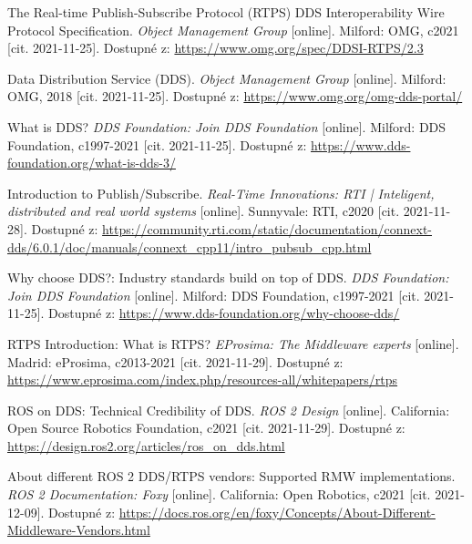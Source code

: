 \begin{thebibliography}{99}
The Real-time Publish-Subscribe Protocol (RTPS) DDS Interoperability Wire Protocol Specification. \textit{Object Management Group} [online]. Milford: OMG, c2021 [cit. 2021-11-25]. Dostupné z: \href{https://www.omg.org/spec/DDSI-RTPS/2.3}{https://www.omg.org/spec/DDSI-RTPS/2.3}
	
Data Distribution Service (DDS). \textit{Object Management Group} [online]. Milford: OMG, 2018 [cit. 2021-11-25]. Dostupné z: \href{https://www.omg.org/omg-dds-portal/}{https://www.omg.org/omg-dds-portal/}

What is DDS? \textit{DDS Foundation: Join DDS Foundation} [online]. Milford: DDS Foundation, c1997-2021 [cit. 2021-11-25]. Dostupné z: \href{https://www.dds-foundation.org/what-is-dds-3/}{https://www.dds-foundation.org/what-is-dds-3/}

Introduction to Publish/Subscribe. \textit{Real-Time Innovations: RTI | Inteligent, distributed and real world systems} [online]. Sunnyvale: RTI, c2020 [cit. 2021-11-28]. Dostupné z: \href{https://community.rti.com/static/documentation/connext-dds/6.0.1/doc/manuals/connext\_dds/getting\_started/cpp11/intro\_pubsub\_cpp.html}{https://community.rti.com/static/documentation/connext-dds/6.0.1/doc/manuals/connext\_cpp11/intro\_pubsub\_cpp.html}

Why choose DDS?: Industry standards build on top of DDS. \textit{DDS Foundation: Join DDS Foundation} [online]. Milford: DDS Foundation, c1997-2021 [cit. 2021-11-25]. Dostupné z: \href{https://www.dds-foundation.org/why-choose-dds/}{https://www.dds-foundation.org/why-choose-dds/}

RTPS Introduction: What is RTPS? \textit{EProsima: The Middleware experts} [online]. Madrid: eProsima, c2013-2021 [cit. 2021-11-29]. Dostupné z: \href{https://www.eprosima.com/index.php/resources-all/whitepapers/rtps}{https://www.eprosima.com/index.php/resources-all/whitepapers/rtps}

ROS on DDS: Technical Credibility of DDS. \textit{ROS 2 Design} [online]. California: Open Source Robotics Foundation, c2021 [cit. 2021-11-29]. Dostupné z: \href{https://design.ros2.org/articles/ros\_on\_dds.html}{https://design.ros2.org/articles/ros\_on\_dds.html}


About different ROS 2 DDS/RTPS vendors: Supported RMW implementations. \textit{ROS 2 Documentation: Foxy} [online]. California: Open Robotics, c2021 [cit. 2021-12-09]. Dostupné z: \href{https://docs.ros.org/en/foxy/Concepts/About-Different-Middleware-Vendors.html}{https://docs.ros.org/en/foxy/Concepts/About-Different-Middleware-Vendors.html}


\end{thebibliography}
